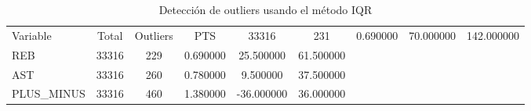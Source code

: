 \begin{table}
\caption{Detección de outliers usando el método IQR}
\label{tab:outliers_iqr}
\begin{tabular}{lccccc}
\toprule
Variable & Total & Outliers & %
\midrule
PTS & 33316 & 231 & 0.690000 & 70.000000 & 142.000000 \\
REB & 33316 & 229 & 0.690000 & 25.500000 & 61.500000 \\
AST & 33316 & 260 & 0.780000 & 9.500000 & 37.500000 \\
PLUS_MINUS & 33316 & 460 & 1.380000 & -36.000000 & 36.000000 \\
\bottomrule
\end{tabular}
\end{table}
